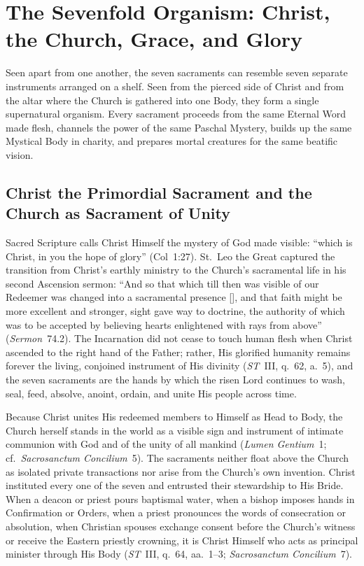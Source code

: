 \section{The Sevenfold Organism: Christ, the Church, Grace, and Glory}
\label{sec:synthesis}

Seen apart from one another, the seven sacraments can resemble seven separate instruments arranged on a shelf. Seen from the pierced side of Christ and from the altar where the Church is gathered into one Body, they form a single supernatural organism. Every sacrament proceeds from the same Eternal Word made flesh, channels the power of the same Paschal Mystery, builds up the same Mystical Body in charity, and prepares mortal creatures for the same beatific vision.

\subsection{Christ the Primordial Sacrament and the Church as Sacrament of Unity}
\label{subsec:christ-primordial-sacrament}

Sacred Scripture calls Christ Himself the mystery of God made visible: ``which is Christ, in you the hope of glory'' (Col~1:27). St.~Leo the Great captured the transition from Christ's earthly ministry to the Church's sacramental life in his second Ascension sermon: ``And so that which till then was visible of our Redeemer was changed into a sacramental presence [], and that faith might be more excellent and stronger, sight gave way to doctrine, the authority of which was to be accepted by believing hearts enlightened with rays from above'' (\emph{Sermon}~74.2). The Incarnation did not cease to touch human flesh when Christ ascended to the right hand of the Father; rather, His glorified humanity remains forever the living, conjoined instrument of His divinity (\emph{ST}~III, q.~62, a.~5), and the seven sacraments are the hands by which the risen Lord continues to wash, seal, feed, absolve, anoint, ordain, and unite His people across time.

Because Christ unites His redeemed members to Himself as Head to Body, the Church herself stands in the world as a visible sign and instrument of intimate communion with God and of the unity of all mankind (\emph{Lumen Gentium}~1; cf.~\emph{Sacrosanctum Concilium}~5). The sacraments neither float above the Church as isolated private transactions nor arise from the Church's own invention. Christ instituted every one of the seven and entrusted their stewardship to His Bride. When a deacon or priest pours baptismal water, when a bishop imposes hands in Confirmation or Orders, when a priest pronounces the words of consecration or absolution, when Christian spouses exchange consent before the Church's witness or receive the Eastern priestly crowning, it is Christ Himself who acts as principal minister through His Body (\emph{ST}~III, q.~64, aa.~1--3; \emph{Sacrosanctum Concilium}~7).

